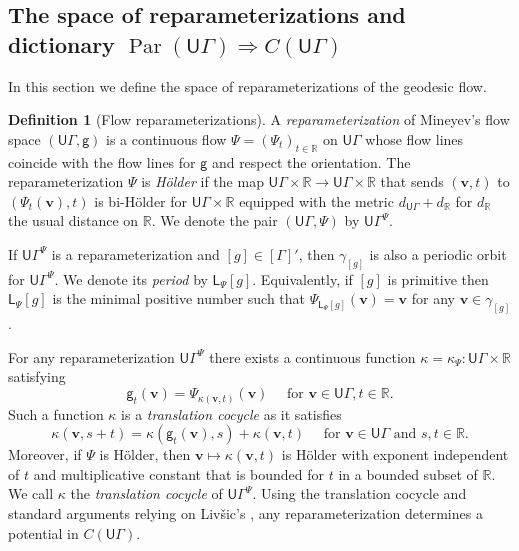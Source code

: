 \documentclass[twoside]{amsart}
\theoremstyle{definition}
\newtheorem{definition}[theorem]{Definition}
\numberwithin{equation}{section}
\numberwithin{theorem}{section}
\newcommand{\msf}[1]{\mathsf{#1}}
\newcommand{\R}{\mathbb{R}}
\newcommand{\G}{\Gamma}
\newcommand{\gam}{\gamma}
\renewcommand{\k}{\kappa}
\DeclareMathOperator{\Par}{Par}
\newcommand{\Ra}{\Rightarrow}
\newcommand{\ra}{\rightarrow}
\newcommand{\vv}{\mathbf{v}}
\newcommand{\UG}{\msf{U}\G}
\newcommand{\vg}{\msf{g}}
\newcommand{\sfP}{\mathsf{\Psi}}
\begin{document}



\subsection{The space of reparameterizations and dictionary $\Par(\UG) \Ra C(\UG)$}\label{subsec:reparameterizations}

In this section we define the space of reparameterizations of the geodesic flow.

\begin{definition}[Flow reparameterizations]\label{def:reparameterizations}
    A \emph{reparameterization} of Mineyev's flow space $(\UG,\vg)$ is a continuous flow $\sfP=(\sfP_t)_{t\in \R}$ on $\UG$ whose flow lines coincide with the flow lines for $\vg$ and respect the orientation. The reparameterization $\sfP$ is \emph{H\"older} if the map $\UG\times \R \ra \UG \times \R$ that sends $(\vv,t)$ to $(\sfP_t(\vv),t)$ is bi-H\"older for $\UG\times \R$ equipped with the metric $d_{\UG}+d_\R$ for $d_\R$ the usual distance on $\R$. We denote the pair $(\UG,\sfP)$ by $\UG^\sfP$.
\end{definition}

If $\UG^\sfP$ is a reparameterization and $[g]\in [\G]'$, then $\gam_{[g]}$ is also a periodic orbit for $\UG^\sfP$. We denote its \emph{period} by $\msf{L}_{\sfP}[g]$. Equivalently, if $[g]$ is primitive then $\msf{L}_{\sfP}[g]$ is the minimal positive number such that $\sfP_{\msf{L}_{\sfP}[g]}(\vv)=\vv$ for any $\vv\in \gam_{[g]}$. 

For any reparameterization $\UG^\sfP$ there exists a continuous function $\k=\k_\sfP:\UG \times \R$ satisfying
\begin{equation*}
    \vg_t(\vv)=\sfP_{\k(\vv,t)}(\vv) \quad \text{ for }\vv\in \UG, t\in \R.  
\end{equation*}
Such a function $\k$ is a \emph{translation cocycle} as it satisfies
\[\k(\vv,s+t)=\k(\vg_t(\vv),s)+\k(\vv,t) \quad \text{ for }\vv\in \UG \text{ and } s,t\in \R.\]
Moreover, if $\sfP$ is H\"older, then $\vv\mapsto \k(\vv,t)$ is H\"older with exponent independent of $t$ and multiplicative constant that is bounded for $t$ in a bounded subset of $\R$. We call $\k$ the \emph{translation cocycle} of $\UG^\sfP$. Using the translation cocycle and standard arguments relying on Liv\v{s}ic's , any reparameterization determines a potential in $C(\UG).$
\end{document}
